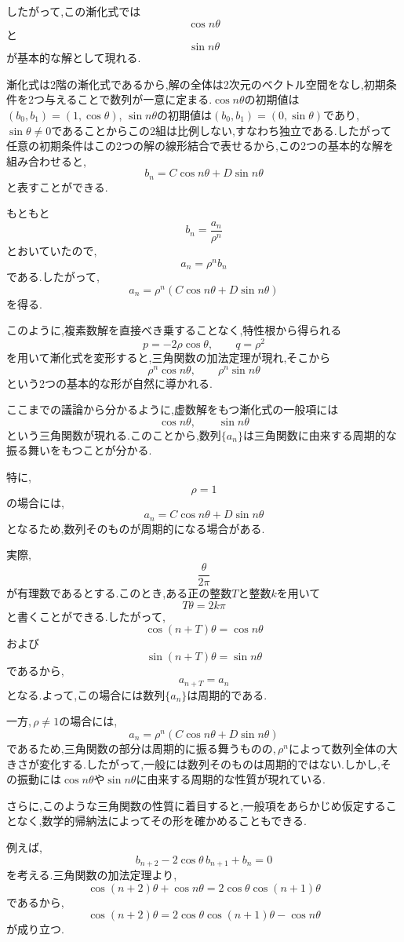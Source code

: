   したがって,この漸化式では
  \[
    \cos n\theta
  \]
  と
  \[
    \sin n\theta
  \]
  が基本的な解として現れる.

  漸化式は2階の漸化式であるから,解の全体は2次元のベクトル空間をなし,初期条件を2つ与えることで数列が一意に定まる.$\cos n\theta$の初期値は$(b_0,b_1)=(1,\cos\theta)$, $\sin n\theta$の初期値は$(b_0,b_1)=(0,\sin\theta)$であり,\,$\sin\theta\ne0$であることからこの2組は比例しない,すなわち独立である.したがって任意の初期条件はこの2つの解の線形結合で表せるから,この2つの基本的な解を組み合わせると,
  \[
    b_n=C\cos n\theta+D\sin n\theta
  \]
  と表すことができる.

  もともと
  \[
    b_n=\frac{a_n}{\rho^n}
  \]
  とおいていたので,
  \[
    a_n=\rho^n b_n
  \]
  である.したがって,
  \[
    a_n=\rho^n
    (C\cos n\theta+D\sin n\theta)
  \]
  を得る.

  このように,複素数解を直接べき乗することなく,特性根から得られる
  \[
    p=-2\rho\cos\theta,\qquad q=\rho^2
  \]
  を用いて漸化式を変形すると,三角関数の加法定理が現れ,そこから
  \[
    \rho^n\cos n\theta,\qquad
    \rho^n\sin n\theta
  \]
  という2つの基本的な形が自然に導かれる.

  ここまでの議論から分かるように,虚数解をもつ漸化式の一般項には
  \[
    \cos n\theta,\qquad \sin n\theta
  \]
  という三角関数が現れる.このことから,数列$\{a_n\}$は三角関数に由来する周期的な振る舞いをもつことが分かる.

  特に,
  \[
    \rho=1
  \]
  の場合には,
  \[
    a_n=C\cos n\theta+D\sin n\theta
  \]
  となるため,数列そのものが周期的になる場合がある.

  実際,
  \[
    \frac{\theta}{2\pi}
  \]
  が有理数であるとする.このとき,ある正の整数$T$と整数$k$を用いて
  \[
    T\theta=2k\pi
  \]
  と書くことができる.したがって,
  \[
    \cos(n+T)\theta=\cos n\theta
  \]
  および
  \[
    \sin(n+T)\theta=\sin n\theta
  \]
  であるから,
  \[
    a_{n+T}=a_n
  \]
  となる.よって,この場合には数列$\{a_n\}$は周期的である.

  一方,\,$\rho\neq1$の場合には,
  \[
    a_n=\rho^n
    (C\cos n\theta+D\sin n\theta)
  \]
  であるため,三角関数の部分は周期的に振る舞うものの,\,$\rho^n$によって数列全体の大きさが変化する.したがって,一般には数列そのものは周期的ではない.しかし,その振動には$\cos n\theta$や$\sin n\theta$に由来する周期的な性質が現れている.

  さらに,このような三角関数の性質に着目すると,一般項をあらかじめ仮定することなく,数学的帰納法によってその形を確かめることもできる.

  例えば,
  \[
    b_{n+2}-2\cos\theta\,b_{n+1}+b_n=0
  \]
  を考える.三角関数の加法定理より,
  \[
    \cos(n+2)\theta+\cos n\theta
    =2\cos\theta\cos(n+1)\theta
  \]
  であるから,
  \[
    \cos(n+2)\theta
    =2\cos\theta\cos(n+1)\theta-\cos n\theta
  \]
  が成り立つ.

